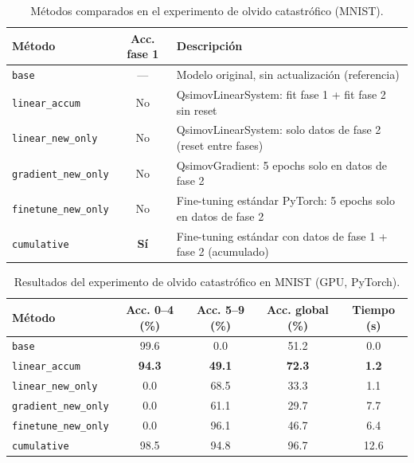 \begin{table}[htbp]
  \centering
  \caption{Métodos comparados en el experimento de olvido catastrófico (MNIST).}
  \label{tab:metodos_forgetting_mnist}
  \begin{tabular}{lcp{7cm}}
    \toprule
    \textbf{Método} & \textbf{Acc. fase 1} & \textbf{Descripción} \\
    \midrule
    \texttt{base}              & ---        & Modelo original, sin actualización (referencia) \\
    \texttt{linear\_accum}     & No         & QsimovLinearSystem: fit fase 1 + fit fase 2 sin reset \\
    \texttt{linear\_new\_only} & No         & QsimovLinearSystem: solo datos de fase 2 (reset entre fases) \\
    \texttt{gradient\_new\_only} & No       & QsimovGradient: 5 epochs solo en datos de fase 2 \\
    \texttt{finetune\_new\_only} & No       & Fine-tuning estándar PyTorch: 5 epochs solo en datos de fase 2 \\
    \texttt{cumulative}        & \textbf{Sí} & Fine-tuning estándar con datos de fase 1 + fase 2 (acumulado) \\
    \bottomrule
  \end{tabular}
\end{table}

\begin{table}[htbp]
  \centering
  \caption{Resultados del experimento de olvido catastrófico en MNIST (GPU, PyTorch).}
  \label{tab:tabla4}
  \small
  \begin{tabular}{lcccc}
    \toprule
    \textbf{Método} & \textbf{Acc. 0--4 (\%)} & \textbf{Acc. 5--9 (\%)} & \textbf{Acc. global (\%)} & \textbf{Tiempo (s)} \\
    \midrule
    \texttt{base}              &  99.6        &  0.0         & 51.2        & 0.0 \\
    \texttt{linear\_accum}     & \textbf{94.3} & \textbf{49.1} & \textbf{72.3} & \textbf{1.2} \\
    \texttt{linear\_new\_only} &   0.0        & 68.5         & 33.3        & 1.1 \\
    \texttt{gradient\_new\_only} & 0.0        & 61.1         & 29.7        & 7.7 \\
    \texttt{finetune\_new\_only} & 0.0        & 96.1         & 46.7        & 6.4 \\
    \texttt{cumulative}        &  98.5        & 94.8         & 96.7        & 12.6 \\
    \bottomrule
  \end{tabular}
\end{table}

